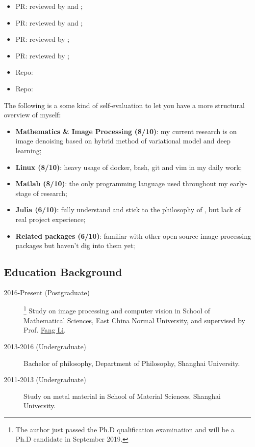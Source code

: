 \begin{itemize}
    \item PR:  reviewed by \evizero and \timholy;
    \item PR:  reviewed by \evizero and \timholy;
    \item PR:  reviewed by \mbauman;
    \item PR:  reviewed by \mikeinnes;
    \item Repo: \repodeeplearningtutorial
    \item Repo: \repodipcode
\end{itemize}

The following is a some kind of self-evaluation to let you have a more structural overview of myself:

\begin{itemize}
    \item \textbf{Mathematics \& Image Processing (8/10)}: my current research is on image denoising based on hybrid method of variational model and deep learning;
    \item \textbf{Linux (8/10)}: heavy usage of docker, bash, git and vim in my daily work;
    \item \textbf{Matlab (8/10)}: the only programming language used throughout my early-stage of research;
    \item \textbf{Julia (6/10)}: fully understand and stick to the philosophy of \langjulia, but lack of real project experience;
    \item \textbf{Related packages (6/10)}: familiar with other open-source image-processing packages but haven't dig into them yet;
\end{itemize}


\subsection{Education Background}

\begin{description}
    \item[2016-Present (Postgraduate)]\footnote{The author just passed the Ph.D qualification examination and will be a Ph.D candidate in September 2019.} Study on image processing and computer vision in School of Mathematical Sciences, East China Normal University, and supervised by Prof. \href{http://math.ecnu.edu.cn/~fli/}{\textsf{Fang Li}}.
    \item[2013-2016 (Undergraduate)] Bachelor of philosophy, Department of Philosophy, Shanghai University.
    \item[2011-2013 (Undergraduate)] Study on metal material in School of Material Sciences, Shanghai University.
\end{description}
